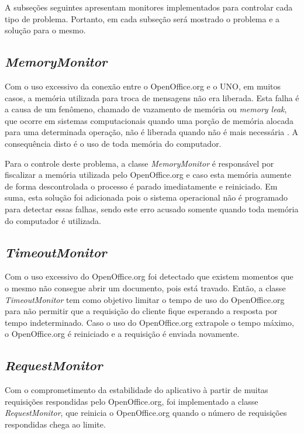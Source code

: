 A subseções seguintes apresentam monitores implementados para controlar cada tipo de problema. Portanto, em cada subseção será mostrado o problema e a solução para o mesmo.

\subsection{\textit{MemoryMonitor}}

Com o uso excessivo da conexão entre o OpenOffice.org e o UNO, em muitos casos, a memória utilizada para troca de mensagens não era liberada. Esta falha é a causa de um fenômeno, chamado de vazamento de memória ou \textit{memory leak}, que ocorre em sistemas computacionais quando uma porção de memória alocada para uma determinada operação, não é liberada quando não é mais necessária \cite{1211498}. A consequência disto é o uso de toda memória do computador. 

Para o controle deste problema, a classe \textit{MemoryMonitor} é responsável por fiscalizar a memória utilizada pelo OpenOffice.org e caso esta memória aumente de forma descontrolada o processo é parado imediatamente e reiniciado. Em suma, esta solução foi adicionada pois o sistema operacional não é programado para detectar essas falhas, sendo este erro acusado somente quando toda memória do computador é utilizada.

\subsection{\textit{TimeoutMonitor}}

Com o uso excessivo do OpenOffice.org foi detectado que existem momentos que o mesmo não consegue abrir um documento, pois está travado. Então, a classe \textit{TimeoutMonitor} tem como objetivo limitar o tempo de uso do OpenOffice.org para não permitir que a requisição do cliente fique esperando a resposta por tempo indeterminado. Caso o uso do OpenOffice.org extrapole o tempo máximo, o OpenOffice.org é reiniciado e a requisição é enviada novamente.

\subsection{\textit{RequestMonitor}}

Com o comprometimento da estabilidade do aplicativo à partir de muitas requisições respondidas pelo OpenOffice.org, foi implementado a classe \textit{RequestMonitor}, que reinicia o OpenOffice.org quando o número de requisições respondidas chega ao limite.

